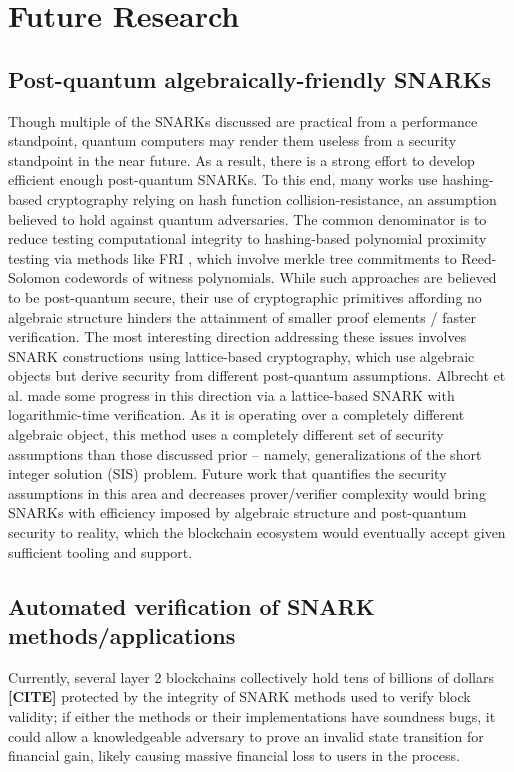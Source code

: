 \section{Future Research}

\subsection{Post-quantum algebraically-friendly SNARKs}
\noindent Though multiple of the SNARKs discussed are practical from a performance standpoint, quantum computers may render them useless from a security standpoint in the near future. As a result, there is a strong effort to develop efficient enough post-quantum SNARKs. To this end, many works \cite{starks, ligero, fractal, spartan} use hashing-based cryptography relying on hash function collision-resistance, an assumption believed to hold against quantum adversaries. The common denominator is to reduce testing computational integrity to hashing-based polynomial proximity testing via methods like FRI \cite{fri}, which involve merkle tree commitments to Reed-Solomon codewords of witness polynomials. While such approaches are believed to be post-quantum secure, their use of cryptographic primitives affording no algebraic structure hinders the attainment of smaller proof elements / faster verification. The most interesting direction addressing these issues involves SNARK constructions using lattice-based cryptography, which use algebraic objects but derive security from different post-quantum assumptions. Albrecht et al. \cite{lattice1} made some progress in this direction via a lattice-based SNARK with logarithmic-time verification. As it is operating over a completely different algebraic object, this method uses a completely different set of security assumptions than those discussed prior -- namely, generalizations of the short integer solution (SIS) problem. Future work that quantifies the security assumptions in this area and decreases prover/verifier complexity would bring SNARKs with efficiency imposed by algebraic structure and post-quantum security to reality, which the blockchain ecosystem would eventually accept given sufficient tooling and support.

\subsection{Automated verification of SNARK methods/applications}
\noindent Currently, several layer 2 blockchains collectively hold tens of billions of dollars \textbf{[CITE]} protected by the integrity of SNARK methods used to verify block validity; if either the methods or their implementations have soundness bugs, it could allow a knowledgeable adversary to prove an invalid state transition for financial gain, likely causing massive financial loss to users in the process. \\

